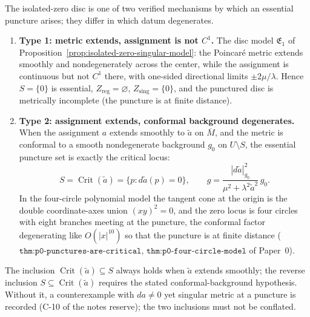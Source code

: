 The isolated-zero disc is one of two verified mechanisms by which an essential
puncture arises; they differ in which datum degenerates.

\begin{theorem}
\label{thm:two-essential-puncture-mechanisms}
\begin{enumerate}
  \item \textbf{Type 1: metric extends, assignment is not $C^1$.} The disc model
  $\mathfrak E_1$ of Proposition~\ref{prop:isolated-zero-singular-model}: the
  Poincar\'e metric extends smoothly and nondegenerately across the center,
  while the assignment is continuous but not $C^1$ there, with one-sided
  directional limits $\pm 2\mu/\lambda$.  Hence $S=\{0\}$ is essential,
  $Z_{\mathrm{reg}}=\varnothing$, $Z_{\mathrm{sing}}=\{0\}$, and the punctured
  disc is metrically incomplete (the puncture is at finite distance).
  \item \textbf{Type 2: assignment extends, conformal background degenerates.}
  When the assignment $a$ extends smoothly to $\widetilde a$ on $\overline M$,
  and the metric is conformal to a smooth nondegenerate background $g_0$ on
  $U\setminus S$, the essential puncture set is exactly the critical locus:
  \[
    S=\operatorname{Crit}(\widetilde a)=\{p:d\widetilde a(p)=0\},
    \qquad
    g=\frac{|d\widetilde a|_{g_0}^2}{\mu^2+\lambda^2\widetilde a^2}\,g_0 .
  \]
  In the four-circle polynomial model the tangent cone at the origin is the
  double coordinate-axes union $(xy)^2=0$, and the zero locus is four circles
  with eight branches meeting at the puncture, the conformal factor degenerating
  like $O(|x|^{10})$ so that the puncture is at finite distance
  ($\texttt{thm:p0-punctures-are-critical}$, $\texttt{thm:p0-four-circle-model}$
  of Paper~0).
\end{enumerate}
\end{theorem}

\begin{remark}
\label{rem:critical-puncture-hypothesis}
The inclusion $\operatorname{Crit}(\widetilde a)\subseteq S$ always holds when
$\widetilde a$ extends smoothly; the reverse inclusion $S\subseteq
\operatorname{Crit}(\widetilde a)$ requires the stated conformal-background
hypothesis.  Without it, a counterexample with $da\neq0$ yet singular metric at
a puncture is recorded (C-10 of the notes reserve); the two inclusions must not
be conflated.
\end{remark}

